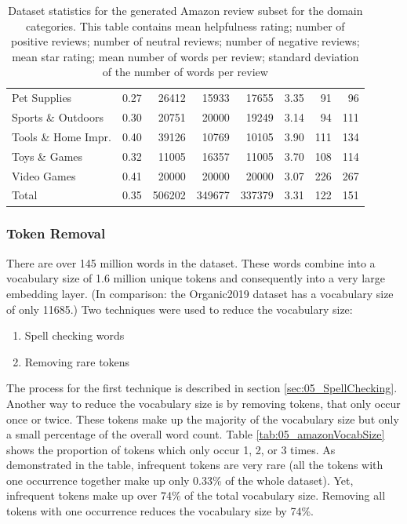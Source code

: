 \begin{table}
\begin{tabularx}{\textwidth}{lXrrrcrr}
		Pet Supplies                &   0.27 &  26412 & 15933 & 17655 &    3.35 &     91 &   96 \\
		Sports \& Outdoors          &   0.30 &  20751 & 20000 & 19249 &    3.14 &     94 &  111 \\
		Tools \& Home Impr.  		&   0.40 &  39126 & 10769 & 10105 &    3.90 &    111 &  134 \\
		Toys \& Games               &   0.32 &  11005 & 16357 & 11005 &    3.70 &    108 &  114 \\
		Video Games                 &   0.41 &   20000 &  	20000 & 20000 &    3.07 &    226 &  267 \\
		\midrule
		Total						&	0.35 & 	   506202 &	349677& 337379&    3.31 &	 122 &  151 \\
		\bottomrule
	\end{tabularx}
	\caption{Dataset statistics for the generated Amazon review subset for the domain categories. This table contains mean helpfulness rating; number of positive reviews; number of neutral reviews; number of negative reviews; mean star rating; mean number of words per review; standard deviation of the number of words per review }
		\label{tab:05_amazonDatasetStats}
\end{table}

\subsubsection*{Token Removal}
There are over 145 million words in the dataset. These words combine into a vocabulary size of 1.6 million unique tokens and consequently into a very large embedding layer. {(In comparison: the Organic2019 dataset has a vocabulary size of only 11685.)} Two techniques were used to reduce the vocabulary size:

\begin{enumerate}
	\item Spell checking words
	\item Removing rare tokens
\end{enumerate}

The process for the first technique is described in section \ref{sec:05_SpellChecking}. Another way to reduce the vocabulary size is by removing tokens, that only occur once or twice. These tokens make up the majority of the vocabulary size but only a small percentage of the overall word count. Table \ref{tab:05_amazonVocabSize} shows the proportion of tokens which only occur 1, 2, or 3 times. As demonstrated in the table, infrequent tokens are very rare {(all the tokens with one occurrence together make up only 0.33\% of the whole dataset)}. Yet, infrequent tokens make up over 74\% of the total vocabulary size. Removing all tokens with one occurrence reduces the vocabulary size by 74\%.

